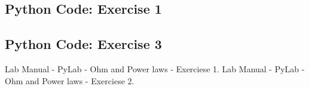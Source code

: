 \documentclass[letterpaper,12pt]{article}
\begin{document}
\subsection*{Python Code: Exercise 1}



\pagebreak

\subsection*{Python Code: Exercise 3}

\pagebreak

\begin{thebibliography}{99}

 Lab Manual - PyLab - Ohm and Power laws - Exerciese 1.
 Lab Manual - PyLab - Ohm and Power laws - Exerciese 2.

\end{thebibliography}
\end{document}
